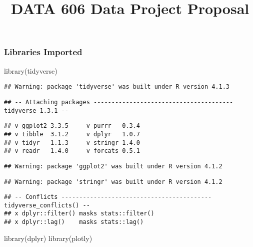 \documentclass[
]{article}
\title{DATA 606 Data Project Proposal}
\author{}
\date{\vspace{-2.5em}}
\newenvironment{Shaded}{\begin{snugshade}}{\end{snugshade}}
\newcommand{\FunctionTok}[1]{\textcolor[rgb]{0.00,0.00,0.00}{#1}}
\newcommand{\NormalTok}[1]{#1}
\begin{document}
\maketitle

\hypertarget{libraries-imported}{%
\subsubsection{Libraries Imported}\label{libraries-imported}}

\begin{Shaded}
\begin{Highlighting}[]
\FunctionTok{library}\NormalTok{(tidyverse)}
\end{Highlighting}
\end{Shaded}

\begin{verbatim}
## Warning: package 'tidyverse' was built under R version 4.1.3
\end{verbatim}

\begin{verbatim}
## -- Attaching packages --------------------------------------- tidyverse 1.3.1 --
\end{verbatim}

\begin{verbatim}
## v ggplot2 3.3.5     v purrr   0.3.4
## v tibble  3.1.2     v dplyr   1.0.7
## v tidyr   1.1.3     v stringr 1.4.0
## v readr   1.4.0     v forcats 0.5.1
\end{verbatim}

\begin{verbatim}
## Warning: package 'ggplot2' was built under R version 4.1.2
\end{verbatim}

\begin{verbatim}
## Warning: package 'stringr' was built under R version 4.1.2
\end{verbatim}

\begin{verbatim}
## -- Conflicts ------------------------------------------ tidyverse_conflicts() --
## x dplyr::filter() masks stats::filter()
## x dplyr::lag()    masks stats::lag()
\end{verbatim}

\begin{Shaded}
\begin{Highlighting}[]
\FunctionTok{library}\NormalTok{(dplyr)}
\FunctionTok{library}\NormalTok{(plotly)}
\end{Highlighting}
\end{Shaded}
\end{document}
